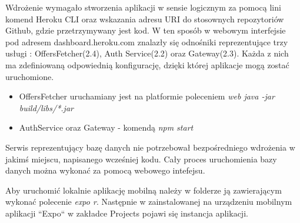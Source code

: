 Wdrożenie wymagało stworzenia aplikacji w sensie logicznym za pomocą lini komend Heroku CLI oraz wskazania adresu URI do stosownych repozytoriów Github, gdzie przetrzymywany jest kod.
W ten sposób w webowym interfejsie pod adresem dashboard.heroku.com znalazły się odnośniki reprezentujące trzy usługi : OffersFetcher(2.4), Auth Service(2.2) oraz Gateway(2.3). Każda z nich ma zdefiniowaną odpowiednią konfigurację, dzięki której aplikacje mogą zostać uruchomione.
\begin{itemize}
	\item {OffersFetcher uruchamiany jest na platformie poleceniem \textit{web java -jar build/libs/*.jar}}
	\item {AuthService oraz Gateway - komendą \textit{npm start}}
\end{itemize}

Serwis reprezentujący bazę danych nie potrzebował bezpośredniego wdrożenia w jakimś miejscu, napisanego wcześniej kodu. Cały proces uruchomienia bazy danych można wykonać za pomocą webowego intefejsu.

Aby uruchomić lokalnie aplikację mobilną należy w folderze ją zawierającym wykonać polecenie \textit{expo r}. Następnie w zainstalowanej na urządzeniu mobilnym aplikacji ``Expo`` w zakładce Projects pojawi się instancja aplikacji.

